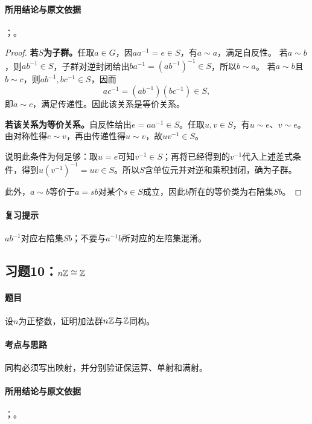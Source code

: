 \paragraph{所用结论与原文依据}
；。


\begin{proof}
\textbf{若$S$为子群。}任取$a\in G$，因$aa^{-1}=e\in S$，有$a\sim a$，满足自反性。
若$a\sim b$，则$ab^{-1}\in S$，子群对逆封闭给出$ba^{-1}=(ab^{-1})^{-1}\in S$，所以$b\sim a$。
若$a\sim b$且$b\sim c$，则$ab^{-1},bc^{-1}\in S$，因而
\[
ac^{-1}=(ab^{-1})(bc^{-1})\in S,
\]
即$a\sim c$，满足传递性。因此该关系是等价关系。

\textbf{若该关系为等价关系。}自反性给出$e=aa^{-1}\in S$。任取$u,v\in S$，有$u\sim e$、$v\sim e$。由对称性得$e\sim v$，再由传递性得$u\sim v$，故$uv^{-1}\in S$。

说明此条件为何足够：取$u=e$可知$v^{-1}\in S$；再将已经得到的$v^{-1}$代入上述差式条件，得到$u(v^{-1})^{-1}=uv\in S$。所以$S$含单位元并对逆和乘积封闭，确为子群。

此外，$a\sim b$等价于$a=sb$对某个$s\in S$成立，因此$b$所在的等价类为右陪集$Sb$。
\end{proof}

\paragraph{复习提示}
$ab^{-1}$对应右陪集$Sb$；不要与$a^{-1}b$所对应的左陪集混淆。


\subsection{习题10：\texorpdfstring{$n\mathbb Z\cong\mathbb Z$}{nZ同构于Z}}
\label{ex:1:10}

\paragraph{题目}
设$n$为正整数，证明加法群$n\mathbb Z$与$\mathbb Z$同构。

\paragraph{考点与思路}
同构必须写出映射，并分别验证保运算、单射和满射。

\paragraph{所用结论与原文依据}
；。


